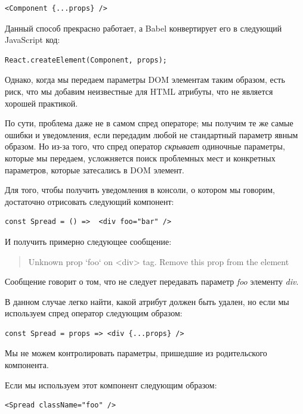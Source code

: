 \begin{lstlisting}
<Component {...props} />
\end{lstlisting} 

Данный способ прекрасно работает, а Babel конвертирует его в следующий JavaScript код:

\begin{lstlisting}
React.createElement(Component, props);
\end{lstlisting}

Однако, когда мы передаем параметры DOM элементам таким образом, есть риск, что мы добавим неизвестные для HTML атрибуты, что не является хорошей практикой. 

По сути, проблема даже не в самом спред операторе; мы получим те же самые ошибки и уведомления, если передадим любой не стандартный параметр явным образом. Но из-за того, что спред оператор \textit{скрывает} одиночные параметры, которые мы передаем, усложняется поиск проблемных мест и конкретных параметров, которые затесались в DOM элемент.

Для того, чтобы получить уведомления в консоли, о котором мы говорим, достаточно отрисовать следующий компонент:

\begin{lstlisting}
const Spread = () =>  <div foo="bar" />
\end{lstlisting}

И получить примерно следующее сообщение:

\begin{quotation}
Unknown prop `foo` on <div> tag. Remove this prop from the element
\end{quotation}

Сообщение говорит о том, что не следует передавать параметр \textit{foo} элементу \textit{div}.

В данном случае легко найти, какой атрибут должен быть удален, но если мы используем спред оператор следующим образом:

\begin{lstlisting}
const Spread = props => <div {...props} />	
\end{lstlisting}

Мы не можем контролировать параметры, пришедшие из родительского компонента.

Если мы используем этот компонент следующим образом:

\begin{lstlisting}
<Spread className="foo" />
\end{lstlisting}

